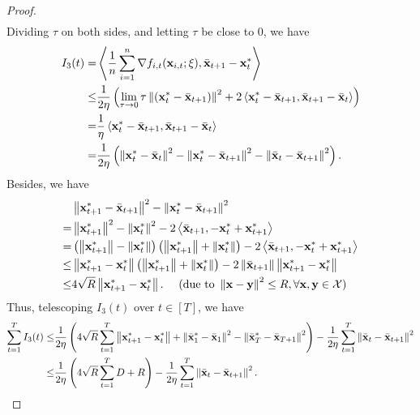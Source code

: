 \documentclass{article}
\begin{document}
\begin{proof}
\begin{align}
\end{align} Dividing $\tau$ on both sides, and letting $\tau$ be close to $0$, we have
\begin{align}
\nonumber
I_3(t) = & \left\langle\frac{1}{n}\sum_{i=1}^n \nabla f_{i,t}({\bf x}_{i,t};\xi), \bar{{\bf x}}_{t+1} - {\bf x}_t^\ast \right\rangle \\ \nonumber 
\le & \frac{1}{2\eta}\left(  \lim_{\tau \rightarrow 0}\tau \left\lVert\left( {\bf x}_t^\ast - \bar{{\bf x}}_{t+1} \right)\right\rVert^2 + 2\left\langle {\bf x}_t^\ast - \bar{{\bf x}}_{t+1}, \bar{{\bf x}}_{t+1} - \bar{{\bf x}}_t  \right\rangle  \right) \\ \nonumber
= & \frac{1}{\eta}\left\langle {\bf x}_t^\ast - \bar{{\bf x}}_{t+1}, \bar{{\bf x}}_{t+1} - \bar{{\bf x}}_t  \right\rangle \\ \label{equa_I3_temp}
= & \frac{1}{2\eta}\left(  \left\lVert{\bf x}_t^\ast - \bar{{\bf x}}_t\right\rVert^2 - \left\lVert{\bf x}_t^\ast - \bar{{\bf x}}_{t+1}\right\rVert^2 - \left\lVert\bar{{\bf x}}_t - \bar{{\bf x}}_{t+1}\right\rVert^2  \right). 
\end{align} Besides, we have
\begin{align}
\nonumber
& \left\lVert{\bf x}_{t+1}^\ast - \bar{{\bf x}}_{t+1}\right\rVert^2 - \left\lVert{\bf x}_t^\ast - \bar{{\bf x}}_{t+1}\right\rVert^2 \\ \nonumber 
= & \left\lVert{\bf x}_{t+1}^\ast\right\rVert^2 - \left\lVert{\bf x}_t^\ast\right\rVert^2 - 2\left\langle\bar{{\bf x}}_{t+1}, -{\bf x}_t^\ast + {\bf x}_{t+1}^\ast \right\rangle \\ \nonumber
= & \left( \left\lVert{\bf x}_{t+1}^\ast\right\rVert - \left\lVert{\bf x}_t^\ast\right\rVert \right) \left( \left\lVert{\bf x}_{t+1}^\ast\right\rVert + \left\lVert{\bf x}_t^\ast\right\rVert \right) - 2\left\langle\bar{{\bf x}}_{t+1}, -{\bf x}_t^\ast + {\bf x}_{t+1}^\ast \right\rangle \\ \nonumber
\le & \left\lVert{\bf x}_{t+1}^\ast - {\bf x}_t^\ast\right\rVert \left( \left\lVert{\bf x}_{t+1}^\ast\right\rVert + \left\lVert{\bf x}_t^\ast\right\rVert \right) - 2\left\lVert\bar{{\bf x}}_{t+1}\right\rVert \left\lVert{\bf x}_{t+1}^\ast-{\bf x}_t^\ast\right\rVert \\ \nonumber
\le & 4\sqrt{R}\left\lVert{\bf x}_{t+1}^\ast - {\bf x}_t^\ast\right\rVert.    ~~~~(\text{due to } \left\lVert{\bf x} - {\bf y}\right\rVert^2 \le R, \forall {\bf x}, {\bf y}\in{\mathcal{X}}) 
\end{align} Thus, telescoping $I_3(t)$ over $t\in[T]$, we have 
\begin{align}
\nonumber
\sum_{t=1}^T I_3(t) \le & \frac{1}{2\eta}\left(  4\sqrt{R}\sum_{t=1}^T\left\lVert{\bf x}_{t+1}^\ast - {\bf x}_t^\ast\right\rVert + \left\lVert\bar{{\bf x}}_1^\ast - \bar{{\bf x}}_1\right\rVert^2 - \left\lVert\bar{{\bf x}}_T^\ast - \bar{{\bf x}}_{T+1}\right\rVert^2  \right) - \frac{1}{2\eta} \sum_{t=1}^T \left\lVert\bar{{\bf x}}_t - \bar{{\bf x}}_{t+1}\right\rVert^2 \\ \nonumber
\le & \frac{1}{2\eta}\left(  4\sqrt{R}\sum_{t=1}^T D + R  \right) - \frac{1}{2\eta} \sum_{t=1}^T \left\lVert\bar{{\bf x}}_t - \bar{{\bf x}}_{t+1} \right\rVert^2.
\end{align} 



\end{proof}
\end{document}
